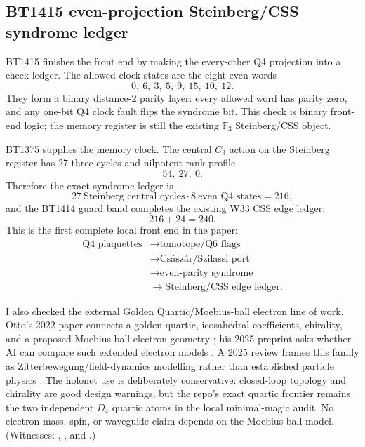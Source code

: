 \documentclass[11pt]{article}
\begin{document}
\subsection{BT1415 even-projection Steinberg/CSS syndrome ledger}

BT1415 finishes the front end by making the every-other Q4 projection into a
check ledger.  The allowed clock states are the eight even words
\[
  0,\ 6,\ 3,\ 5,\ 9,\ 15,\ 10,\ 12.
\]
They form a binary distance-\(2\) parity layer: every allowed word has parity
zero, and any one-bit Q4 clock fault flips the syndrome bit.  This check is
binary front-end logic; the memory register is still the existing
\(\mathbb F_3\) Steinberg/CSS object.

BT1375 supplies the memory clock.  The central \(C_3\) action on the Steinberg
register has \(27\) three-cycles and nilpotent rank profile
\[
  54,\ 27,\ 0.
\]
Therefore the exact syndrome ledger is
\[
  27\ \text{Steinberg central cycles}\cdot
  8\ \text{even Q4 states}=216,
\]
and the BT1414 guard band completes the existing W33 CSS edge ledger:
\[
  216+24=240.
\]
This is the first complete local front end in the paper:
\begin{align*}
  \text{Q4 plaquettes}&\rightarrow \text{tomotope/Q6 flags}\\
  &\rightarrow \text{Cs\'asz\'ar/Szilassi port}\\
  &\rightarrow \text{even-parity syndrome}\\
  &\rightarrow \text{Steinberg/CSS edge ledger}.
\end{align*}

I also checked the external Golden Quartic/Moebius-ball electron line of work.
Otto's 2022 paper connects a golden quartic, icosahedral coefficients, chirality,
and a proposed Moebius-ball electron geometry \cite{otto-golden-moebius}; his
2025 preprint asks whether AI can compare such extended electron models
\cite{otto-ai-electron-model}.  A 2025 review frames this family as
Zitterbewegung/field-dynamics modelling rather than established particle
physics \cite{fleury-zitter-review}.  The holonet use is deliberately
conservative: closed-loop topology and chirality are good design warnings, but
the repo's exact quartic frontier remains the two independent \(D_4\) quartic
atoms in the local minimal-magic audit.  No electron mass, spin, or waveguide
claim depends on the Moebius-ball model.  (Witnesses:
,
, and
.)
\end{document}
